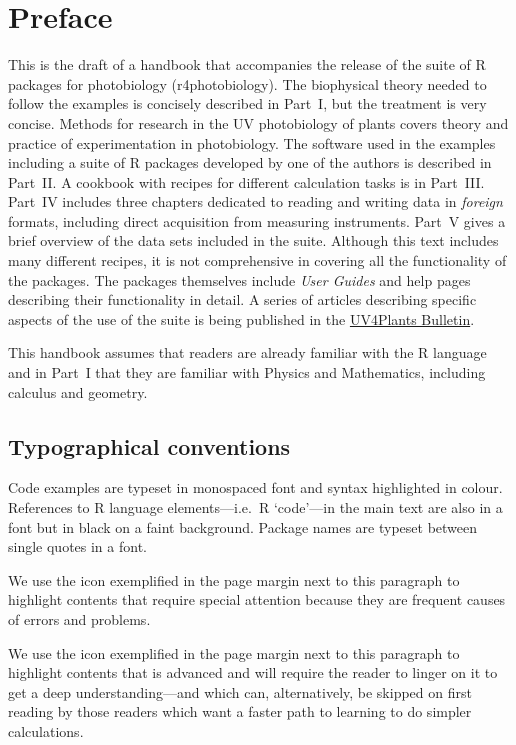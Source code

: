 \chapter{Preface}

This is the draft of a handbook that accompanies the release of the suite of R packages for photobiology (\textsf{r4photobiology}). The biophysical theory needed to follow the examples is concisely described in Part~I, but the treatment is very concise\autocite[][is an exhaustive treaty on phototobiology]{Bjoern2015}. Methods for research in the UV photobiology of plants \autocite{Aphalo2012} covers theory and practice of experimentation in photobiology. The software used in the examples including a suite of R packages developed by one of the authors is described in Part~II. A cookbook with recipes for different calculation tasks is in Part~III. Part~IV includes three chapters dedicated to reading and writing data in \emph{foreign} formats, including direct acquisition from measuring instruments. Part~V gives a brief overview of the data sets included in the suite. Although this text includes many different recipes, it is not comprehensive in covering all the functionality of the packages. The packages themselves include \emph{User Guides} and help pages describing their functionality in detail. A series of articles describing specific aspects of the use of the suite is being published in the \href{http://uv4plants.org/publications/uv4plants-bulletin-published-issues/}{UV4Plants Bulletin}.

This handbook assumes that readers are already familiar with the R language and in Part~I that they are familiar with Physics and Mathematics, including calculus and geometry.

\section{Typographical conventions}

Code examples are typeset in monospaced font and syntax highlighted in colour. References to R language elements---i.e.\ R `code'---in the main text are also in a  font but in black on a faint background. Package names are typeset between single quotes in a  font.

We\Attention{} use the icon exemplified in the page margin next to this paragraph to highlight contents that require special attention because they are frequent causes of errors and problems.

We\Advanced{} use the icon exemplified in the page margin next to this paragraph to highlight contents that is advanced and will require the reader to linger on it to get a deep understanding---and which can, alternatively, be skipped on first reading by those readers which want a faster path to learning to do simpler calculations.


